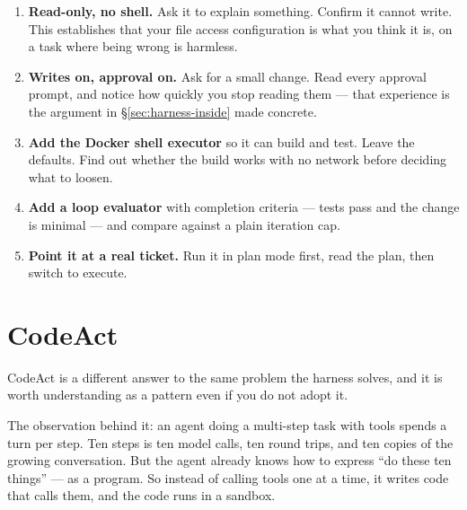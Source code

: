 \begin{enumerate}[leftmargin=1.4em]
\item \textbf{Read-only, no shell.} Ask it to explain something. Confirm it
      cannot write. This establishes that your file access configuration is what
      you think it is, on a task where being wrong is harmless.
\item \textbf{Writes on, approval on.} Ask for a small change. Read every
      approval prompt, and notice how quickly you stop reading them --- that
      experience is the argument in \S\ref{sec:harness-inside} made concrete.
\item \textbf{Add the Docker shell executor} so it can build and test. Leave the
      defaults. Find out whether the build works with no network before deciding
      what to loosen.
\item \textbf{Add a loop evaluator} with completion criteria --- tests pass and
      the change is minimal --- and compare against a plain iteration cap.
\item \textbf{Point it at a real ticket.} Run it in plan mode first, read the
      plan, then switch to execute.
\end{enumerate}


\section{CodeAct}
\label{sec:harness-codeact}

CodeAct is a different answer to the same problem the harness solves, and it is
worth understanding as a pattern even if you do not adopt it.

The observation behind it: an agent doing a multi-step task with tools spends a
turn per step. Ten steps is ten model calls, ten round trips, and ten copies of
the growing conversation. But the agent already knows how to express ``do these
ten things'' --- as a program. So instead of calling tools one at a time, it
writes code that calls them, and the code runs in a sandbox.

